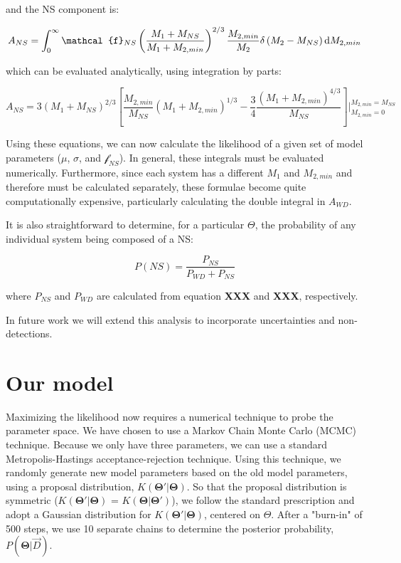 \documentclass[letterpaper,12pt,preprint]{aastex}
\begin{document}
and the NS component is:

\begin{equation}
A_{NS} = \int_0^{\infty} \mathcal{f}_{NS}\left( \frac{M_1 + M_{NS}}{M_1 + M_{2,min}} \right)^{2/3} \frac{M_{2,min}}{M_2} \delta \left( M_2 - M_{NS} \right) {\rm d}M_{2,min}
\end{equation}

which can be evaluated analytically, using integration by parts:

\begin{equation}
A_{NS} = 3 \left(M_1+M_{NS}\right)^{2/3} \left[  \frac{M_{2,min}}{M_{NS}} \left( M_1+M_{2,min} \right)^{1/3} - \frac{3}{4} \frac{ \left( M_1 + M_{2,min} \right)^{4/3} }{M_{NS}} \right] |_{M_{2,min}=0}^{M_{2,min}=M_{NS}}
\end{equation}

Using these equations, we can now calculate the likelihood of a given set of model parameters ($\mu$, $\sigma$, and $\mathcal{f}_{NS}$). In general, these integrals must be evaluated numerically. Furthermore, since each system has a different $M_1$ and $M_{2,min}$ and therefore must be calculated separately, these formulae become quite computationally expensive, particularly calculating the double integral in $A_{WD}$. 


It is also straightforward to determine, for a particular $\Theta$, the probability of any individual system being composed of a NS:

\begin{equation}
P(NS) = \frac{P_{NS}}{P_{WD} + P_{NS}}
\end{equation}

where $P_{NS}$ and $P_{WD}$ are calculated from equation {\bf XXX} and {\bf XXX}, respectively.  

In future work we will extend this analysis to incorporate uncertainties and non-detections. 



\section{Our model}


Maximizing the likelihood now requires a numerical technique to probe the parameter space. We have chosen to use a Markov Chain Monte Carlo (MCMC) technique. Because we only have three parameters, we can use a standard Metropolis-Hastings acceptance-rejection technique. Using this technique, we randomly generate new model parameters based on the old model parameters, using a proposal distribution, $K(\mathbf{\Theta '} | \mathbf{\Theta})$. So that the proposal distribution is symmetric ($K(\mathbf{\Theta '} | \mathbf{\Theta})$ = $K(\mathbf{\Theta} | \mathbf{\Theta '})$), we follow the standard prescription and adopt a Gaussian distribution for $K(\mathbf{\Theta '} | \mathbf{\Theta})$, centered on $\Theta$. After a "burn-in" of 500 steps, we use 10 separate chains to determine the posterior probability, $P(\mathbf{\Theta} | \vec{D})$.
\end{document}
